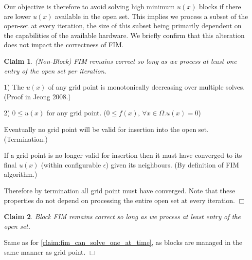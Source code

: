 \documentclass[11pt]{article}       %
\newtheorem{claim}{Claim}
\newenvironment{proof}           {\noindent{\bf Proof.} }%
                                 {\null\hfill$\Box$\par\medskip}
\begin{document}
Our objective is therefore to avoid solving high minimum $u(x)$ blocks if there are lower $u(x)$ available in the open set. This implies we process a subset of the open-set at every iteration, the size of this subset being primarily dependent on the capabilities of the available hardware. We briefly confirm that this alteration does not impact the correctness of FIM.
\begin{claim}\label{claim:fim_can_solve_one_at_time}
(Non-Block) FIM remains correct so long as we process at least one entry of the open set per iteration.
\end{claim}
\begin{proof}
	
1) The $u(x)$ of any grid point is monotonically decreasing over multiple solves. (Proof in Jeong 2008\cite{jeong2008fast}.)

2) $0 \le u(x)$ for any grid point. ($0 \le f(x)$, $\forall x \in \Omega. u(x) = 0$)

Eventually no grid point will be valid for insertion into the open set. (Termination.)

If a grid point is no longer valid for insertion then it must have converged to its final $u(x)$ (within configurable $\epsilon$) given its neighbours. (By definition of FIM algorithm.)

Therefore by termination all grid point must have converged. Note that these properties do not depend on processing the entire open set at every iteration.
\end{proof}
\begin{claim}
Block FIM remains correct so long as we process at least entry of the open set.
\end{claim}
\begin{proof}
Same as for \autoref{claim:fim_can_solve_one_at_time}, as blocks are managed in the same manner as grid point.
\end{proof}
\end{document}
